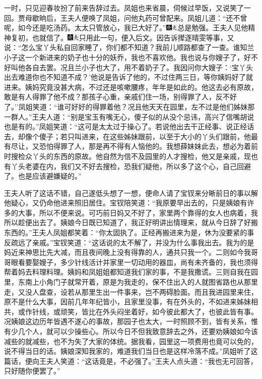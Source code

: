 一时，只见迎春妆扮了前来告辞过去。凤姐也来省晨，伺候过早饭，又说笑了一回。贾母歇晌后，王夫人便唤了凤姐，问他丸药可曾配来。凤姐儿道：``还不曾呢，如今还是吃汤药。太太只管放心，我已大好了。''{\includegraphics[width=3mm]{../Images/00004}\includegraphics[width=3mm]{../Images/00012}\footnotesize \kaishu 总是勉强。}王夫人见他精神复初，也就信了。{\includegraphics[width=3mm]{../Images/00004}\includegraphics[width=3mm]{../Images/00012}\footnotesize \kaishu 只用此一句，便入后文。}因告诉撵逐晴雯等事，又说：``怎么宝丫头私自回家睡了，你们都不知道？我前儿顺路都查了一查。谁知兰小子这一个新进来的奶子也十分的妖乔，我也不喜欢他。我也说与你嫂子了，好不好叫他各自去罢。况且兰小子也大了，用不着奶子了。我因问你大嫂子：`宝丫头出去难道你也不知道不成？'他说是告诉了他的，不过住两三日，等你姨妈好了就进来。姨妈究竟没甚大病，不过还是咳嗽腰疼，年年是如此的。他这去必有原故，敢是有人得罪了他不成？那孩子心重，亲戚们住一场，别得罪了人，反不好了。''凤姐笑道：``谁可好好的得罪着他？况且他天天在园里，左不过是他们姊妹那一群人。''王夫人道：``别是宝玉有嘴无心，傻子似的从没个忌讳，高兴了信嘴胡说也是有的。''凤姐笑道：``这可是太太过于操心了。若说他出去干正经事、说正经话去，却像个傻子；若只叫进来，在这些姊妹跟前，以至于大小的丫头们跟前，他最有尽让，又恐怕得罪了人，那是再不得有人恼他的。我想薛妹妹此去，想必为着前时搜检众丫头的东西的原故。他自然为信不及园里的人才搜检，他又是亲戚，现也有丫头老婆在内，我们又不好去搜检，恐我们疑他，所以多了这个心，自己回避了。也是应该避嫌疑的。''

王夫人听了这话不错，自己遂低头想了一想，便命人请了宝钗来分晰前日的事以解他疑心，又仍命他进来照旧居住。宝钗陪笑道：``我原要早出去的，只是姨娘有许多的大事，所以不便来说。可巧前日妈又不好了，家里两个靠得的女人也病着，我所以趁便出去了。姨娘今日既已知道了，我正好明讲出情理来，就从今日辞了好搬东西的。''王夫人凤姐都笑着：``你太固执了。正经再搬进来为是，休为没要紧的事反疏远了亲戚。''宝钗笑道：``这话说的太不解了，并没为什么事我出去。我为的是妈近来神思比先大减，而且夜间晚上没有得靠的人，通共只我一个。二则如今我哥哥眼看要娶嫂子，多少针线活计并家里一切动用的器皿，尚有未齐备的，我也须得帮着妈去料理料理。姨妈和凤姐姐都知道我们家的事，不是我撒谎。三则自我在园里，东南上小角门子就常开着，原是为我走的，保不住出入的人就图省路也从那里走，又没人盘查，设若从那里生出一件事来，岂不两碍脸面。而且我进园里来住，原不是什么大事，因前几年年纪皆小，且家里没事，有在外头的，不如进来姊妹相共，或作针线，或顽笑，皆比在外头闷坐着好，如今彼此都大了，也彼此皆有事。况姨娘这边历年皆遇不遂心的事故，那园子也太大，一时照顾不到，皆有关系，惟有少几个人，就可以少操些心。所以今日不但我致意辞去之外，还要劝姨娘如今该减些的就减些，也不为失了大家的体统。据我看，园里这一项费用也竟可以免的，说不得当日的话。姨娘深知我家的，难道我们当日也是这样冷落不成。''凤姐听了这篇话，便向王夫人笑道：``这话竟是，不必强了。''王夫人点头道：``我也无可回答，只好随你便罢了。''

